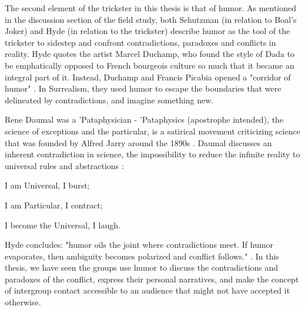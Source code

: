 \documentclass[dissertation,math,vertlayout,pdfa,colorlinks]{aaltoseries}
\begin{document}
The second element of the trickster in this thesis is that of humor. As mentioned in the discussion section of the field study, both Schutzman \cite[p. 88]{schutzmanRadicalDoubtJoker2018} (in relation to Boal's Joker) and Hyde \cite[c. 11] {hydeTricksterMakesThis2017} (in relation to the trickster) describe humor as the tool of the trickster to sidestep and confront contradictions, paradoxes and conflicts in reality. Hyde quotes the artist Marcel Duchamp, who found the style of Dada to be emphatically opposed to French bourgeois culture so much that it became an integral part of it. Instead, Duchamp and Francis Picabia opened a "corridor of humor" \cite[p. 81]{pazMarcelDuchampAppearance1990}. In Surrealism, they used humor to escape the boundaries that were delineated by contradictions, and imagine something new.

Rene Daumal was a 'Pataphysician - 'Pataphysics (apostrophe intended), the science of exceptions and the particular, is a satirical movement criticizing science that was founded by Alfred Jarry around the 1890s \cite{hugillPataphysicsUselessGuide2012}. Daumal discusses an inherent contradiction in science, the impossibility to reduce the infinite reality to universal rules and abstractions \cite[p. 15]{daumalPataphysicalEssays2012}:
\begin{displayquote}
I am Universal, I burst;

I am Particular, I contract;

I become the Universal, I laugh.
\end{displayquote}
Hyde concludes: "humor oils the joint where contradictions meet. If humor evaporates, then ambiguity becomes polarized and conflict follows." \cite[c. 11]{hydeTricksterMakesThis2017}. In this thesis, we have seen the groups use humor to discuss the contradictions and paradoxes of the conflict, express their personal narratives, and make the concept of intergroup contact accessible to an audience that might not have accepted it otherwise.
\end{document}
